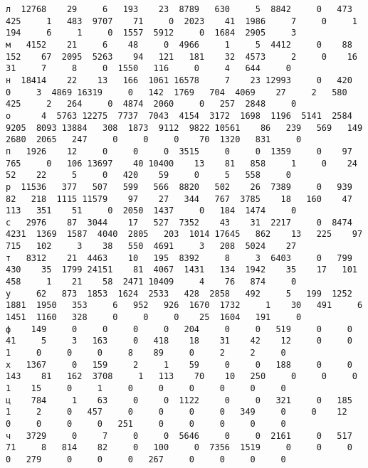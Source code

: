 \documentclass{article}
\begin{document}
\begin{addmargin}{-4em}
\begin{verbatim}
л  12768    29     6   193    23  8789   630     5  8842     0   473   425     1   483  9707    71     0  2023    41  1986     7     0     1   194     6     1     0  1557  5912     0  1684  2905     3
м   4152    21     6    48     0  4966     1     5  4412     0    88   152    67  2095  5263    94   121   181    32  4573     2     0    16    31     7     8     0  1550   116     0     4   644     0
н  18414    22    13   166  1061 16578     7    23 12993     0   420     0     3  4869 16319     0   142  1769   704  4069    27     2   580   425     2   264     0  4874  2060     0   257  2848     0
о      4  5763 12275  7737  7043  4154  3172  1698  1196  5141  2584  9205  8093 13884   308  1873  9112  9822 10561    86   239   569   149  2680  2065   247     0     0     0    70  1320   831     0
п   1926    12     0     0     0  3515     0     0  1359     0    97   765     0   106 13697    40 10400    13    81   858     1     0    24    52    22     5     0   420    59     0     5   558     0
р  11536   377   507   599   566  8820   502    26  7389     0   939    82   218  1115 11579    97    27   344   767  3785    18   160    47   113   351    51     0  2050  1437     0   184  1474     0
с   2976    87  3044    17   527  7352    43    31  2217     0  8474  4231  1369  1587  4040  2805   203  1014 17645   862    13   225    97   715   102     3    38   550  4691     3   208  5024    27
т   8312    21  4463    10   195  8392     8     3  6403     0   799   430    35  1799 24151    81  4067  1431   134  1942    35    17   101   458     1    21    58  2471 10409     4    76   874     0
у     62   873  1853  1624  2533   428  2858   492     5   199  1252  1881  1950   353     6   952   926  1670  1732     1    30   491     6  1451  1160   328     0     0     0    25  1604   191     0
ф    149     0     0     0     0   204     0     0   519     0     0    41     5     3   163     0   418    18    31    42    12     0     0     1     0     0     0     8    89     0     2     2     0
х   1367     0   159     2     1    59     0     0   188     0     0   143    81   162  3708     1   113    70    10   250     0     0     0     1    15     0     1     0     0     0     0     0     0
ц    784     1    63     0     0  1122     0     0   321     0   185     1     2     0   457     0     0     0     0   349     0     0    12     0     0     0     0   251     0     0     0     0     0
ч   3729     0     7     0     0  5646     0     0  2161     0   517    71     8   814    82     0   100     0  7356  1519     0     0     0     0   279     0     0     0   267     0     0     0     0

\end{verbatim}
\end{addmargin}
\end{document}
